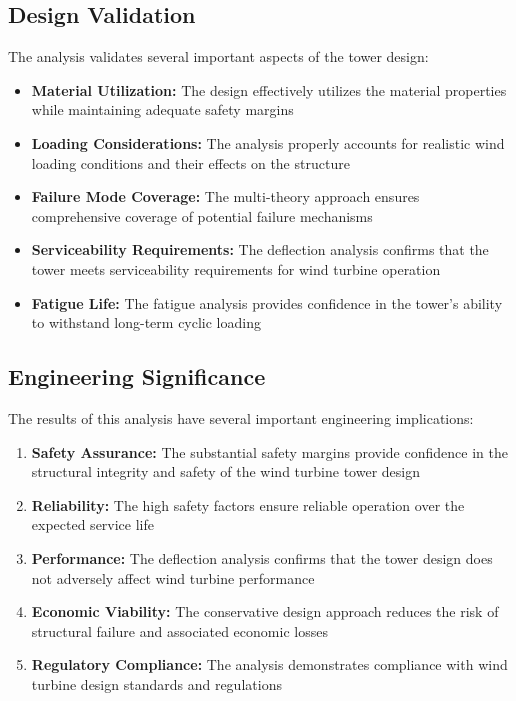 \documentclass[12pt]{article}
\begin{document}
\subsection{Design Validation}

The analysis validates several important aspects of the tower design:

\begin{itemize}
    \item \textbf{Material Utilization:} The design effectively utilizes the material properties while maintaining adequate safety margins
    \item \textbf{Loading Considerations:} The analysis properly accounts for realistic wind loading conditions and their effects on the structure
    \item \textbf{Failure Mode Coverage:} The multi-theory approach ensures comprehensive coverage of potential failure mechanisms
    \item \textbf{Serviceability Requirements:} The deflection analysis confirms that the tower meets serviceability requirements for wind turbine operation
    \item \textbf{Fatigue Life:} The fatigue analysis provides confidence in the tower's ability to withstand long-term cyclic loading
\end{itemize}

\subsection{Engineering Significance}

The results of this analysis have several important engineering implications:

\begin{enumerate}
    \item \textbf{Safety Assurance:} The substantial safety margins provide confidence in the structural integrity and safety of the wind turbine tower design
    \item \textbf{Reliability:} The high safety factors ensure reliable operation over the expected service life
    \item \textbf{Performance:} The deflection analysis confirms that the tower design does not adversely affect wind turbine performance
    \item \textbf{Economic Viability:} The conservative design approach reduces the risk of structural failure and associated economic losses
    \item \textbf{Regulatory Compliance:} The analysis demonstrates compliance with wind turbine design standards and regulations
\end{enumerate}
\end{document}
